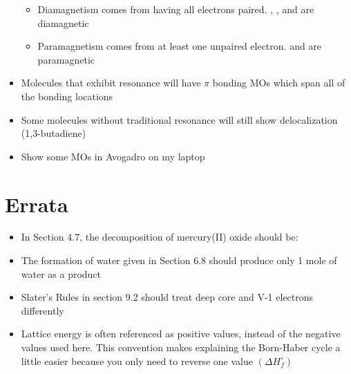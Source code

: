 \documentclass[12pt, openany, letterpaper]{memoir}
\begin{document}
\begin{itemize}
\begin{itemize}
		      \item Diamagnetism comes from having all electrons paired. , , and  are diamagnetic
		      \item Paramagnetism comes from at least one unpaired electron.  and  are paramagnetic
	      \end{itemize}
	\item Molecules that exhibit resonance will have $\pi$ bonding MOs which span all of the bonding locations
	\item Some molecules without traditional resonance will still show delocalization (1,3-butadiene)
	\item Show some MOs in Avogadro on my laptop
\end{itemize}


\backmatter
\chapter{Errata}
\begin{itemize}
	\item In Section 4.7, the decomposition of mercury(II) oxide should be: 
	\item The formation of water given in Section 6.8 should produce only 1 mole of water as a product
	\item Slater's Rules in section 9.2 should treat deep core and V-1 electrons differently
	\item Lattice energy is often referenced as positive values, instead of the negative values used here. This convention makes explaining the Born-Haber cycle a little easier because you only need to reverse one value $\left(\Delta H^\circ_f\right)$
\end{itemize}
\end{document}
